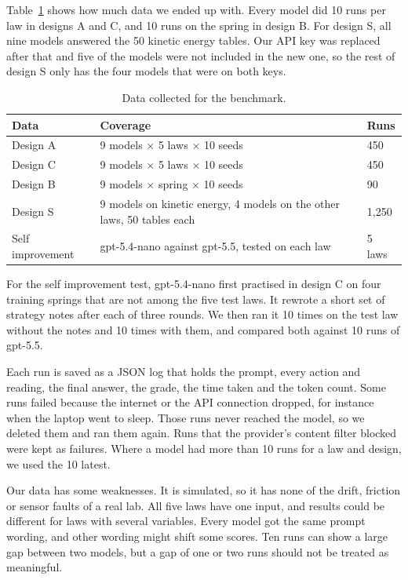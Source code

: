 Table~\ref{tab:datacount} shows how much data we ended up with. Every model did 10 runs per law in designs A and C, and 10 runs on the spring in design B. For design S, all nine models answered the 50 kinetic energy tables. Our API key was replaced after that and five of the models were not included in the new one, so the rest of design S only has the four models that were on both keys.

\begin{table}[h]
\centering
\small
\begin{tabular}{lll}
\hline
Data & Coverage & Runs \\
\hline
Design A & 9 models $\times$ 5 laws $\times$ 10 seeds & 450 \\
Design C & 9 models $\times$ 5 laws $\times$ 10 seeds & 450 \\
Design B & 9 models $\times$ spring $\times$ 10 seeds & 90 \\
Design S & 9 models on kinetic energy, 4 models on the other laws, 50 tables each & 1{,}250 \\
Self improvement & gpt-5.4-nano against gpt-5.5, tested on each law & 5 laws \\
\hline
\end{tabular}
\caption{Data collected for the benchmark.}
\label{tab:datacount}
\end{table}

For the self improvement test, gpt-5.4-nano first practised in design C on four training springs that are not among the five test laws. It rewrote a short set of strategy notes after each of three rounds. We then ran it 10 times on the test law without the notes and 10 times with them, and compared both against 10 runs of gpt-5.5.

Each run is saved as a JSON log that holds the prompt, every action and reading, the final answer, the grade, the time taken and the token count. Some runs failed because the internet or the API connection dropped, for instance when the laptop went to sleep. Those runs never reached the model, so we deleted them and ran them again. Runs that the provider's content filter blocked were kept as failures. Where a model had more than 10 runs for a law and design, we used the 10 latest.

Our data has some weaknesses. It is simulated, so it has none of the drift, friction or sensor faults of a real lab. All five laws have one input, and results could be different for laws with several variables. Every model got the same prompt wording, and other wording might shift some scores. Ten runs can show a large gap between two models, but a gap of one or two runs should not be treated as meaningful.
